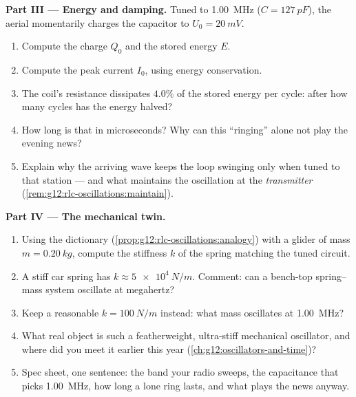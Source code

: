 \begin{problem}
\medskip
\noindent\textbf{Part III --- Energy and damping.}
Tuned to \qty{1.00}{MHz} ($C = \qty{127}{pF}$), the aerial momentarily
charges the capacitor to $U_0 = \qty{20}{mV}$.
\begin{enumerate}[resume]
  \item Compute the charge $Q_0$ and the stored energy $E$.
  \item Compute the peak current $I_0$, using energy conservation.
  \item The coil's resistance dissipates $4.0\%$ of the stored energy
        per cycle: after how many cycles has the energy halved?
  \item How long is that in microseconds? Why can this ``ringing''
        alone not play the evening news?
  \item Explain why the arriving wave keeps the loop swinging only
        when tuned to that station --- and what maintains the
        oscillation at the \emph{transmitter}
        (\cref{rem:g12:rlc-oscillations:maintain}).
\end{enumerate}

\medskip
\noindent\textbf{Part IV --- The mechanical twin.}
\begin{enumerate}[resume]
  \item Using the dictionary (\cref{prop:g12:rlc-oscillations:analogy})
        with a glider of mass $m = \qty{0.20}{kg}$, compute the
        stiffness $k$ of the spring matching the tuned circuit.
  \item A stiff car spring has $k \approx \qty{5e4}{N/m}$. Comment:
        can a bench-top spring--mass system oscillate at megahertz?
  \item Keep a reasonable $k = \qty{100}{N/m}$ instead: what mass
        oscillates at \qty{1.00}{MHz}?
  \item What real object is such a featherweight, ultra-stiff
        mechanical oscillator, and where did you meet it earlier this
        year (\cref{ch:g12:oscillators-and-time})?
  \item Spec sheet, one sentence: the band your radio sweeps, the
        capacitance that picks \qty{1.00}{MHz}, how long a lone ring
        lasts, and what plays the news anyway.
\end{enumerate}
\end{problem}
